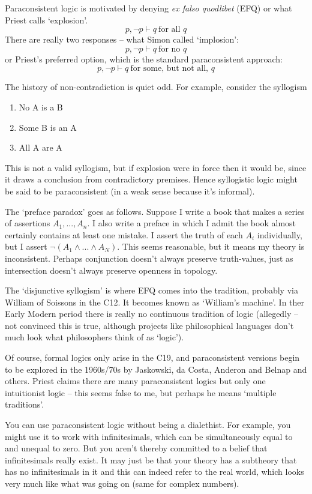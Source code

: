 \documentclass[oneside,english]{article}
\theoremstyle{plain}
\theoremstyle{definition}
\theoremstyle{definition}
\begin{document}
Paraconsistent logic is motivated by denying \emph{ex falso quodlibet} (EFQ) or what Priest calls `explosion'. 
\[
	p, \lnot p \vdash q \ \text{for all $q$}
\]
There are really two responses -- what Simon called `implosion':
\[
	p, \lnot p \vdash q \ \text{for no $q$}
\]
or Priest's preferred option, which is the standard paraconsistent approach:
\[
	p, \lnot p \vdash q \ \text{for some, but not all, $q$}
\]

The history of non-contradiction is quiet odd. For example, consider the syllogism
\begin{enumerate}
	\item No A is a B
	\item Some B is an A
	\item All A are A
\end{enumerate}
This is not a valid syllogism, but if explosion were in force then it would be, since it draws a conclusion from contradictory premises. Hence syllogistic logic might be said to be paraconsistent (in a weak sense because it's informal).

The `preface paradox' goes as follows. Suppose I write a book that makes a series of assertions $A_1, ..., A_n$. I also write a preface in which I admit the book almost certainly contains at least one mistake. I assert the truth of each $A_i$ individually, but I assert $\lnot(A_1\land ...\land A_N)$. This seems reasonable, but it means my theory is inconsistent. Perhaps conjunction doesn't always preserve truth-values, just as intersection doesn't always preserve openness in topology.

The `disjunctive syllogism' is where EFQ comes into the tradition, probably via William of Soissons in the C12. It becomes known as `William's machine'. In ther Early Modern period there is really no continuous tradition of logic (allegedly -- not convinced this is true, although projects like philosophical languages don't much look what philosophers think of as `logic').

Of course, formal logics only arise in the C19, and paraconsistent versions begin to be explored in the 1960s/70s by Jaskowski, da Costa, Anderon and Belnap and others. Priest claims there are many paraconsistent logics but only one intuitionist logic -- this seems false to me, but perhaps he means `multiple traditions'.

You can use paraconsistent logic without being a dialethist. For example, you might use it to work with infinitesimals, which can be simultaneously equal to and unequal to zero. But you aren't thereby committed to a belief that infinitesimals really exist. It may just be that your theory has a subtheory that has no infinitesimals in it and this can indeed refer to the real world, which looks very much like what was going on (same for complex numbers).
\end{document}
